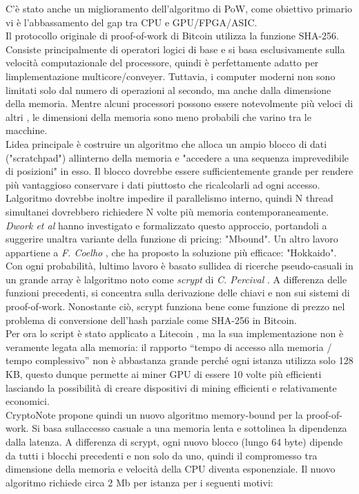 C'è stato anche un miglioramento dell'algoritmo di PoW, come obiettivo
primario vi è l'abbassamento del gap tra CPU e GPU/FPGA/ASIC.\\
Il protocollo originale di proof-of-work di Bitcoin utilizza la funzione
SHA-256.\\
Consiste principalmente di operatori logici di base e si basa
esclusivamente sulla velocità computazionale del processore, quindi è
perfettamente adatto per l\textquotesingle implementazione
multicore/conveyer. Tuttavia, i computer moderni non sono limitati solo
dal numero di operazioni al secondo, ma anche dalla dimensione della
memoria. Mentre alcuni processori possono essere notevolmente più veloci
di altri \cite{mining_hardware}, le dimensioni della memoria sono meno probabili
che varino tra le macchine.\\
L\textquotesingle idea principale è costruire un algoritmo che alloca un
ampio blocco di dati ("scratchpad") all\textquotesingle interno della
memoria e "accedere a una sequenza imprevedibile di posizioni" in esso.
Il blocco dovrebbe essere sufficientemente grande per rendere più
vantaggioso conservare i dati piuttosto che ricalcolarli ad ogni
accesso. L\textquotesingle algoritmo dovrebbe inoltre impedire il
parallelismo interno, quindi N thread simultanei dovrebbero richiedere N
volte più memoria contemporaneamente.\\
\emph{Dwork et al} \cite{dwork_et_al} hanno investigato e formalizzato questo
approccio, portandoli a suggerire un\textquotesingle altra variante
della funzione di pricing: "Mbound". Un altro lavoro appartiene a \emph{F.
Coelho} \cite{coelho}, che ha proposto la soluzione più efficace:
"Hokkaido". Con ogni probabilità, l\textquotesingle ultimo lavoro è
basato sull\textquotesingle idea di ricerche pseudo-casuali in un grande
array è l\textquotesingle algoritmo noto come \emph{scrypt} di \emph{C. Percival}
\cite{percival}. A differenza delle funzioni precedenti, si concentra sulla
derivazione delle chiavi e non sui sistemi di proof-of-work. Nonostante
ciò, scrypt funziona bene come funzione di prezzo nel problema di
conversione dell'hash parziale come SHA-256 in Bitcoin.\\
Per ora lo script è stato applicato a Litecoin \cite{litecoin}, ma la sua
implementazione non è veramente legata alla memoria: il rapporto ``tempo
di accesso alla memoria / tempo complessivo'' non è abbastanza grande
perché ogni istanza utilizza solo 128 KB, questo dunque permette ai
miner GPU di essere 10 volte più efficienti lasciando la possibilità di
creare dispositivi di mining efficienti e relativamente economici.\\
CryptoNote propone quindi un nuovo algoritmo memory-bound per la
proof-of-work. Si basa sull\textquotesingle accesso casuale a una
memoria lenta e sottolinea la dipendenza dalla latenza. A differenza di
scrypt, ogni nuovo blocco (lungo 64 byte) dipende da tutti i blocchi
precedenti e non solo da uno, quindi il compromesso tra dimensione della
memoria e velocità della CPU diventa esponenziale. Il nuovo algoritmo
richiede circa 2 Mb per istanza per i seguenti motivi:

